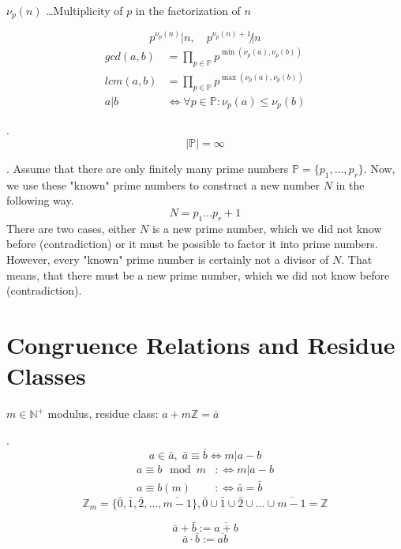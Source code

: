 $\nu_p(n)$ \ldots Multiplicity of $p$ in the factorization of $n$

\[
  p^{\nu_p(n)} | n, \quad p^{\nu_p(n)+1} \not| n
\]
\begin{align*}
  gcd(a,b) &= \prod_{p \in \mathbb{P}} p ^{\min(\nu_p(a), \nu_p(b))} \\
  lcm(a,b) &= \prod_{p \in \mathbb{P}} p ^{\max(\nu_p(a), \nu_p(b))} \\
  a|b &\iff \forall p \in \mathbb{P} : \nu_p(a) \leq \nu_p(b)
\end{align*}

\Theorem.
\[
  | \mathbb{P} | = \infty
\]

\Proof.
Assume that there are only finitely many prime numbers $\mathbb{P} = \{p_1, \ldots , p_r\}$. Now, we use these "known" prime numbers to construct a new number $N$ in the following way. 
\[
	N = p_1 \ldots p_r + 1 
\]
There are two cases, either $N$ is a new prime number, which we did not know before (contradiction) or it must be possible to factor it into prime numbers. However, every "known" prime number is certainly not a divisor of $N$. That means, that there must be a new prime number, which we did not know before (contradiction).

\section{Congruence Relations and Residue Classes}

\begin{definition}
$m \in \mathbb{N}^{+}$ modulus,
residue class: $a+m \mathbb{Z} = \bar{a}$
\end{definition}

\Remark.
\[
  a\in \bar{a},\; \bar{a} \equiv \bar{b} \iff m | a-b
\]
\begin{align*}
  a \equiv b \mod m & :\iff m | a-b \\
  a \equiv b (m)     & :\iff \bar{a} = \bar{b}
\end{align*}
\[
  \mathbb{Z}_m = \{ \bar{0},\bar{1},\bar{2}, \ldots, \overline{m-1}\} ,
  \bar{0} \cup \bar{1} \cup \bar{2} \cup  \ldots \cup \overline{m-1} = \mathbb{Z}
\]


\begin{definition}
\[
  \bar{a} + \bar{b} := \overline{a+b}
\]
\[
  \bar{a} \cdot \bar{b} := \overline{ab}
\]
\end{definition}


